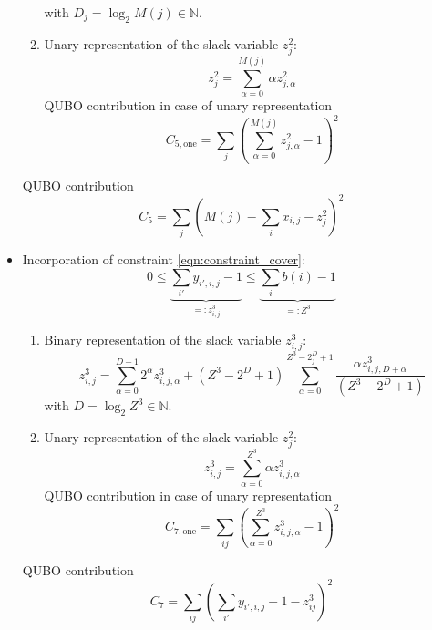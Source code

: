 \documentclass{article}
\begin{document}
\begin{itemize}
\begin{enumerate}
        with $D_j = \log_2 M(j) \in \mathbb{N}$.
        \item 
        Unary representation of the slack variable $z^2_j$:
        \begin{equation*}
            z^2_{j} = \sum_{\alpha = 0}^{M(j)} \alpha z^2_{j, \alpha}
        \end{equation*}
        QUBO contribution in case of unary representation
        \begin{equation*}
            C_{5, \text{one}} = \sum_{j} \left( \sum_{\alpha = 0}^{M(j)} z^2_{j, \alpha} - 1 \right)^2
        \end{equation*}
    \end{enumerate}
    QUBO contribution
    \begin{equation*}
        C_5 = \sum_j \left( M(j) - \sum_i x_{i,j} -  z^2_j \right)^2
    \end{equation*}
\item Incorporation of constraint \eqref{eqn:constraint_cover}:
    \begin{equation*}
        0 \leq \underbrace{\sum_{i'} y_{i', i, j} - 1}_{=:z^3_{i, j}} \leq \underbrace{\sum_i b(i) - 1}_{=:Z^3}
    \end{equation*}
    \begin{enumerate}
        \item 
        Binary representation of the slack variable $z^3_{i, j}$:
        \begin{equation*}
            z^3_{i, j} = \sum_{\alpha = 0}^{D - 1} 2^\alpha z^3_{i, j, \alpha} + (Z^3 - 2^D + 1) \sum_{\alpha=0}^{Z^3 - 2^D_j + 1} \frac{\alpha z^3_{i, j,  D + \alpha}}{(Z^3 - 2^D + 1)} 
        \end{equation*}
        with $D = \log_2 Z^3 \in \mathbb{N}$.
        \item 
        Unary representation of the slack variable $z^2_j$:
        \begin{equation*}
            z^3_{i, j} = \sum_{\alpha = 0}^{Z^3} \alpha z^3_{i, j, \alpha}
        \end{equation*}
        QUBO contribution in case of unary representation
        \begin{equation*}
            C_{7, \text{one}} = \sum_{ij} \left( \sum_{\alpha = 0}^{Z^3} z^3_{i, j, \alpha} - 1 \right)^2
        \end{equation*}
    \end{enumerate}
    QUBO contribution
    \begin{equation*}
        C_7 = \sum_{ij} \left(\sum_{i'} y_{i', i, j} - 1 -  z^3_{ij} \right)^2
    \end{equation*}
\end{itemize}
\end{document}
